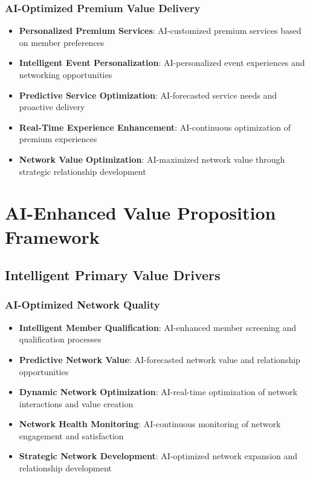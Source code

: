 \subsubsection{AI-Optimized Premium Value Delivery}

\begin{itemize}
    \item \textbf{Personalized Premium Services}: AI-customized premium services based on member preferences
    \item \textbf{Intelligent Event Personalization}: AI-personalized event experiences and networking opportunities
    \item \textbf{Predictive Service Optimization}: AI-forecasted service needs and proactive delivery
    \item \textbf{Real-Time Experience Enhancement}: AI-continuous optimization of premium experiences
    \item \textbf{Network Value Optimization}: AI-maximized network value through strategic relationship development
\end{itemize}

\section{AI-Enhanced Value Proposition Framework}

\subsection{Intelligent Primary Value Drivers}

\subsubsection{AI-Optimized Network Quality}

\begin{itemize}
    \item \textbf{Intelligent Member Qualification}: AI-enhanced member screening and qualification processes
    \item \textbf{Predictive Network Value}: AI-forecasted network value and relationship opportunities
    \item \textbf{Dynamic Network Optimization}: AI-real-time optimization of network interactions and value creation
    \item \textbf{Network Health Monitoring}: AI-continuous monitoring of network engagement and satisfaction
    \item \textbf{Strategic Network Development}: AI-optimized network expansion and relationship development
\end{itemize}

